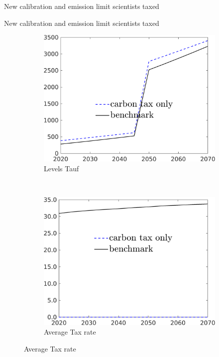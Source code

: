 \documentclass[11pt,aspectratio=169]{beamer}
\begin{document}
\begin{frame}{New calibration and emission limit scientists taxed}
\begin{figure}[h!!]
\begin{subfigure}{0.4\textwidth}
	\end{subfigure}
\end{figure}
\end{frame}

\begin{frame}{New calibration and emission limit scientists taxed}
	\begin{figure}[h!!]
		\centering
		\begin{subfigure}{0.4\textwidth}		
			\caption{{Levels  Tauf}}
			\includegraphics[width=1\textwidth]{../codding_model/own_basedOnFried/optimalPol_010922_revision/figures/all_13Sept22/NewCalib_pol_T_Tauf_emnet1_Sun2_spillover0_knspil3_xgr0_nsk0_sep0_extern0_PV1_etaa0.79_lgd1.png}
		\end{subfigure}
		\begin{minipage}[]{0.1\textwidth}
			\
		\end{minipage}
		\begin{subfigure}{0.4\textwidth}		
			\caption{{Average Tax rate}}
			\includegraphics[width=1\textwidth]{../codding_model/own_basedOnFried/optimalPol_010922_revision/figures/all_13Sept22/NewCalib_pol_T_dTaulAvS_emnet1_Sun2_spillover0_knspil3_xgr0_nsk0_sep0_extern0_PV1_etaa0.79_lgd1.png}

\end{subfigure}
\end{figure}
\end{frame}
\end{document}
